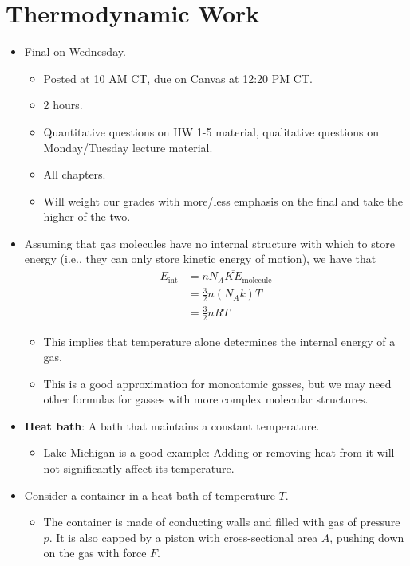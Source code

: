\documentclass[../notes.tex]{subfiles}
\begin{document}
\section{Thermodynamic Work}
\begin{itemize}
    \item {}Final on Wednesday.
    \begin{itemize}
        \item Posted at 10 AM CT, due on Canvas at 12:20 PM CT.
        \item 2 hours.
        \item Quantitative questions on HW 1-5 material, qualitative questions on Monday/Tuesday lecture material.
        \item All chapters.
        \item Will weight our grades with more/less emphasis on the final and take the higher of the two.
    \end{itemize}
    \item Assuming that gas molecules have no internal structure with which to store energy (i.e., they can only store kinetic energy of motion), we have that
    \begin{align*}
        E_\text{int} &= nN_A\overline{KE}_\text{molecule}\\
        &= \frac{3}{2}n(N_Ak)T\\
        &= \frac{3}{2}nRT
    \end{align*}
    \begin{itemize}
        \item This implies that temperature alone determines the internal energy of a gas.
        \item This is a good approximation for monoatomic gasses, but we may need other formulas for gasses with more complex molecular structures.
    \end{itemize}
    \item \textbf{Heat bath}: A bath that maintains a constant temperature.
    \begin{itemize}
        \item Lake Michigan is a good example: Adding or removing heat from it will not significantly affect its temperature.
    \end{itemize}
    \item Consider a container in a heat bath of temperature $T$.
    \begin{itemize}
        \item The container is made of conducting walls and filled with gas of pressure $p$. It is also capped by a piston with cross-sectional area $A$, pushing down on the gas with force $F$.

\end{itemize}
\end{itemize}
\end{document}
